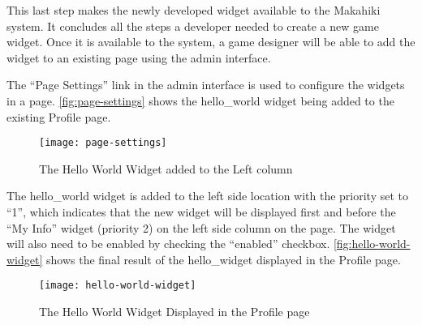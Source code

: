 This last step makes the newly developed widget available to the Makahiki system. It concludes all the steps a developer needed to create a new game widget. Once it is available to the system, a game designer will be able to add the widget to an existing page using the admin interface.

The ``Page Settings'' link in the admin interface is used to configure the widgets in a page. \autoref{fig:page-settings} shows the hello\_world widget being added to the existing Profile page.

\begin{figure}[!ht]
  \center
  \texttt{[image: page-settings]}
  \caption{The Hello World Widget added to the Left column}
  \label{fig:page-settings}
\end{figure}

The hello\_world widget is added to the left side location with the priority set to ``1'', which indicates that the new widget will be displayed first and before the ``My Info'' widget (priority 2) on the left side column on the page.  The widget will also need to be enabled by checking the ``enabled'' checkbox. \autoref{fig:hello-world-widget} shows the final result of the hello\_widget displayed in the Profile page.
\begin{figure}[!ht]
  \center
  \texttt{[image: hello-world-widget]}
  \caption{The Hello World Widget Displayed in the Profile page}
  \label{fig:hello-world-widget}
\end{figure}

